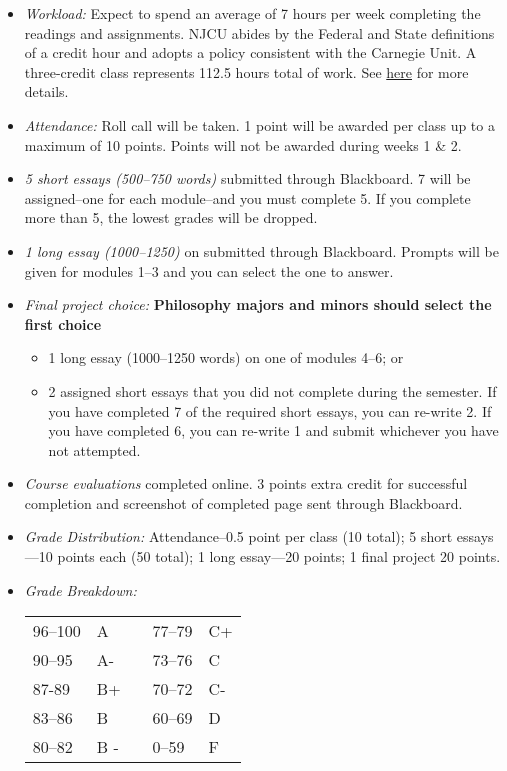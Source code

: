 \documentclass[article,oneside]{memoir}
\begin{document}
\begin{itemize}
\item \textit{Workload:} Expect to spend an average of 7 hours per week completing the readings and assignments. NJCU abides by the Federal and State definitions of a credit hour and adopts a policy consistent with the Carnegie Unit. A three-credit class represents 112.5 hours total of work. See \href{http://scottoconnor.org/resources/Credit.pdf}{here} for more details.

\item \textit{Attendance:} Roll call will be taken. 1 point will be awarded per class up to a maximum of 10 points. Points will not be awarded during weeks 1 \& 2.  

\item \textit{5 short essays (500--750 words)} submitted through Blackboard. 7 will be assigned--one for each module--and you must complete 5. If you complete more than 5, the lowest grades will be dropped.  


\item \textit{1 long essay (1000--1250)} on submitted through Blackboard. Prompts will be given for modules 1--3 and you can select the one to answer.

\item \textit{Final project choice:}  \textbf{Philosophy majors and minors should select the first choice}  

\begin{itemize}
\item 1 long essay (1000--1250 words) on one of modules 4--6; or
\item 2 assigned short essays that you did not complete during the semester. If you have completed 7 of the required short essays, you can re-write 2. If you have completed 6, you can re-write 1 and submit whichever you have not attempted. 
\end{itemize}

\item \textit{Course evaluations} completed online. 3 points extra credit for successful completion and screenshot of completed page sent through Blackboard. 

\item \textit{Grade Distribution:} Attendance--0.5 point per class (10 total); 5 short essays---10 points each (50 total); 1 long essay---20 points; 1 final project 
20 points. 


\item \textit{Grade Breakdown:}

 \begin{tabular}{ | l | l | p{2cm} | l | l | }
    \hline 
96--100 & A  & &  77--79 &  C+ \\  
90--95 & A- & &  73--76 & C \\
87-89 & B+ &  &  70--72 & C- \\ 
83--86 & B  & &  60--69 & D\\
80--82 & B - & & 0--59 & F\\ \hline
    \end{tabular}


\end{itemize}
\end{document}
